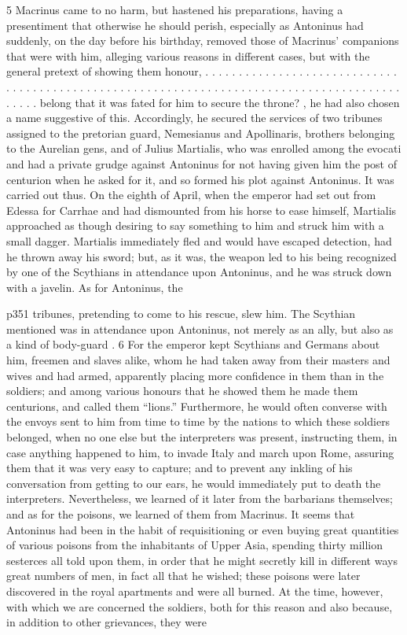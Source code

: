 5
Macrinus came to no harm, but hastened his preparations, having a presentiment that otherwise he should perish, especially as Antoninus had suddenly, on the day before his birthday, removed those of Macrinus' companions that were with him, alleging various reasons in different cases, but with the general pretext of showing them honour, . . . . . . . . . . . . . . . . . . . . . . . . . . . . . . . . . . . . . . . . . . . . . . . . . . . . . . . . . . . . . . . . . . . . . . . . . . . . . . . . . . . . . . . . . . . . . belong that it was fated for him to secure the throne? , he had also chosen a name suggestive of this. Accordingly, he secured the services of two tribunes assigned to the pretorian guard, Nemesianus and Apollinaris, brothers belonging to the Aurelian gens, and of Julius Martialis, who was enrolled among the evocati and had a private grudge against Antoninus for not having given him the post of centurion when he asked for it, and so formed his plot against Antoninus. It was carried out thus. On the eighth of April, when the emperor had set out from Edessa for Carrhae and had dismounted from his horse to ease himself, Martialis approached as though desiring to say something to him and struck him with a small dagger. Martialis immediately fled and would have escaped detection, had he thrown away his sword; but, as it was, the weapon led to his being recognized by one of the Scythians in attendance upon Antoninus, and he was struck down with a javelin. As for Antoninus, the

p351 tribunes, pretending to come to his rescue, slew him. The Scythian mentioned was in attendance upon Antoninus, not merely as an ally, but also as a kind of body-guard . 6
For the emperor kept Scythians and Germans about him, freemen and slaves alike, whom he had taken away from their masters and wives and had armed, apparently pla­cing more confidence in them than in the soldiers; and among various honours that he showed them he made them centurions, and called them ``lions.'' Furthermore, he would often converse with the envoys sent to him from time to time by the nations to which these soldiers belonged, when no one else but the interpreters was present, instructing them, in case anything happened to him, to invade Italy and march upon Rome, assuring them that it was very easy to capture; and to prevent any inkling of his conversation from getting to our ears, he would immediately put to death the interpreters. Nevertheless, we learned of it later from the barbarians themselves; and as for the poisons, we learned of them from Macrinus. It seems that Antoninus had been in the habit of re­quisitioning or even buying great quantities of various poisons from the inhabitants of Upper Asia, spending thirty million sesterces all told upon them, in order that he might secretly kill in different ways great numbers of men, in fact all that he wished; these poisons were later discovered in the royal apartments and were all burned. At the time, however, with which we are concerned the soldiers, both for this reason and also because, in addition to other grievances, they were

